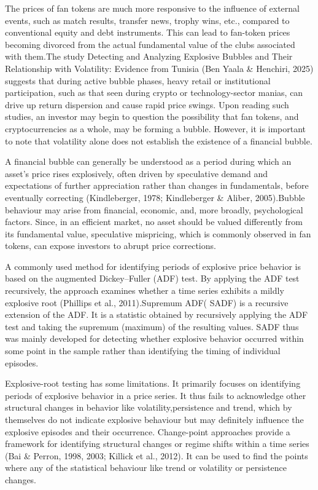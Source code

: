 \documentclass[11pt,a4paper,onecolumn]{article}
\begin{document}
 The prices of fan tokens are much more responsive to the influence of external events, such as match results, transfer news, trophy wins, etc., compared to conventional equity and debt instruments. This can lead to fan-token prices becoming divorced from the actual fundamental value of the clubs associated with them.The study Detecting and Analyzing Explosive Bubbles and Their Relationship with Volatility: Evidence from Tunisia (Ben Yaala \& Henchiri, 2025) suggests that during active bubble phases, heavy retail or institutional participation, such as that seen during crypto or technology-sector manias, can drive up return dispersion and cause rapid price swings. Upon reading such studies, an investor may begin to question the possibility that fan tokens, and cryptocurrencies as a whole, may be forming a bubble. However, it is important to note that volatility alone does not establish the existence of a financial bubble. 

A financial bubble can generally be understood as a period during which an asset's price rises explosively, often driven by speculative demand and expectations of further appreciation rather than changes in fundamentals, before eventually correcting (Kindleberger, 1978; Kindleberger \& Aliber, 2005).Bubble behaviour may arise from financial, economic, and, more broadly, psychological factors. Since, in an efficient market, no asset should be valued differently from its fundamental value, speculative mispricing, which is commonly observed in fan tokens, can expose investors to abrupt price corrections.

A commonly used method for identifying periods of explosive price behavior is based on the augmented Dickey–Fuller (ADF) test. By applying the ADF test recursively, the approach examines whether a time series exhibits a mildly explosive root (Phillips et al., 2011).Supremum ADF( SADF) is a recursive extension of the ADF. It is a statistic obtained by recursively applying the ADF test and taking the supremum (maximum) of the resulting values. SADF thus was mainly developed for detecting whether explosive behavior occurred within some point in the sample rather than identifying the timing of individual episodes.

Explosive-root testing has some limitations. It primarily focuses on identifying periods of explosive behavior in a price series. It thus fails to acknowledge other structural changes in behavior like volatility,persistence and trend, which by themselves do not indicate explosive behaviour but may definitely influence the explosive episodes and their occurrence. Change-point approaches provide a framework for identifying structural changes or regime shifts within a time series (Bai \& Perron, 1998, 2003; Killick et al., 2012). It can be used to find the points where any of the statistical behaviour like trend or volatility or persistence changes.
\end{document}
